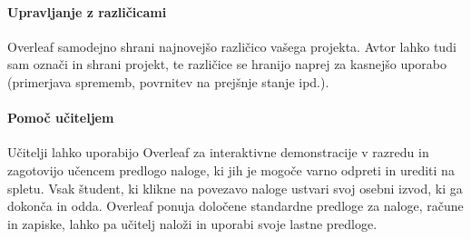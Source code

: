 \documentclass[a4paper, 12pt]{book}
\begin{document}
\paragraph{Upravljanje z različicami}
Overleaf samodejno shrani najnovejšo različico vašega projekta. Avtor lahko tudi sam označi in shrani  projekt, te različice se hranijo naprej za kasnejšo uporabo (primerjava sprememb, povrnitev na prejšnje stanje ipd.). 

\paragraph{Pomoč učiteljem}
Učitelji lahko uporabijo Overleaf za interaktivne demonstracije v razredu in zagotovijo učencem predlogo naloge, ki jih je mogoče varno odpreti in urediti na spletu. Vsak študent, ki klikne na povezavo naloge ustvari svoj osebni izvod, ki ga dokonča in odda. Overleaf ponuja določene standardne predloge za naloge, račune in zapiske, lahko pa učitelj naloži in uporabi svoje lastne predloge.
\end{document}
